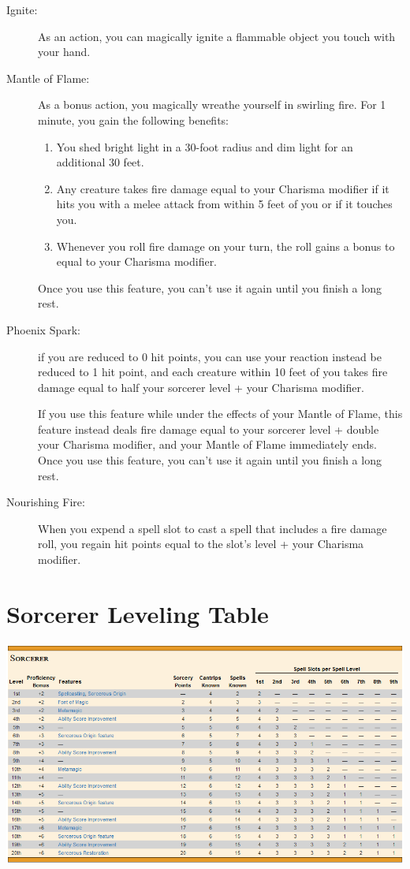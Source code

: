 \documentclass[letterpaper,10pt,twoside,twocolumn,openany]{book}
\begin{document}
\begin{description}
	\item[Ignite:] As an action, you can magically ignite a flammable object you touch with your hand. 
	\item[Mantle of Flame:] As a bonus action, you magically wreathe yourself in swirling fire. For 1 minute, you gain the following benefits:
	
	\begin{enumerate}
		\item You shed bright light in a 30-foot radius and dim light for an additional 30 feet.
		\item Any creature takes fire damage equal to your Charisma modifier if it hits you with a melee attack from within 5 feet of you or if it touches you.
		\item Whenever you roll fire damage on your turn, the roll gains a bonus to equal to your Charisma modifier. 
	\end{enumerate}
	
	Once you use this feature, you can't use it again until you finish a long rest. 
	\item[Phoenix Spark:]  if you are reduced to 0 hit points, you can use your reaction instead be reduced to 1 hit point, and each creature within 10 feet of you takes fire damage equal to half your sorcerer level + your Charisma modifier.
	
	If you use this feature while under the effects of your Mantle of Flame, this feature instead deals fire damage equal to your sorcerer level + double your Charisma modifier, and your Mantle of Flame immediately ends. Once you use this feature, you can't use it again until you finish a long rest. 
	\item[Nourishing Fire:] When you expend a spell slot to cast a spell that includes a fire damage roll, you regain hit points equal to the slot's level + your Charisma modifier. 
\end{description}

\onecolumn
\section{Sorcerer Leveling Table}
\begin{center}
	\includegraphics[width=\linewidth]{img/SpellSlotTable.png}
\end{center}




\end{document}
